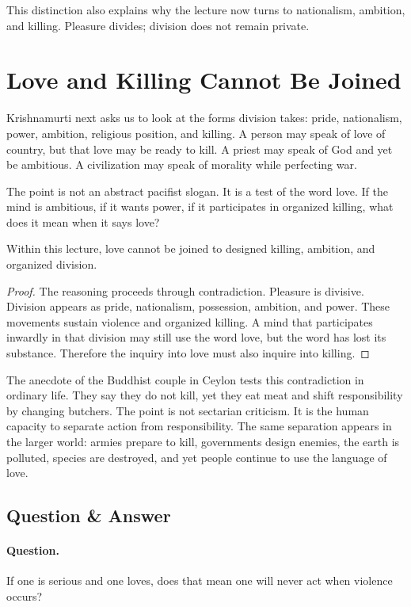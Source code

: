 This distinction also explains why the lecture now turns to nationalism, ambition, and killing. Pleasure divides; division does not remain private.

\section{Love and Killing Cannot Be Joined}

Krishnamurti next asks us to look at the forms division takes: pride, nationalism, power, ambition, religious position, and killing. A person may speak of love of country, but that love may be ready to kill. A priest may speak of God and yet be ambitious. A civilization may speak of morality while perfecting war.

The point is not an abstract pacifist slogan. It is a test of the word love. If the mind is ambitious, if it wants power, if it participates in organized killing, what does it mean when it says love?

\begin{proposition}
Within this lecture, love cannot be joined to designed killing, ambition, and organized division.
\end{proposition}

\begin{proof}
The reasoning proceeds through contradiction. Pleasure is divisive. Division appears as pride, nationalism, possession, ambition, and power. These movements sustain violence and organized killing. A mind that participates inwardly in that division may still use the word love, but the word has lost its substance. Therefore the inquiry into love must also inquire into killing.
\end{proof}

The anecdote of the Buddhist couple in Ceylon tests this contradiction in ordinary life. They say they do not kill, yet they eat meat and shift responsibility by changing butchers. The point is not sectarian criticism. It is the human capacity to separate action from responsibility. The same separation appears in the larger world: armies prepare to kill, governments design enemies, the earth is polluted, species are destroyed, and yet people continue to use the language of love.

\subsection{Question \& Answer}

\paragraph{Question.}
If one is serious and one loves, does that mean one will never act when violence occurs?

